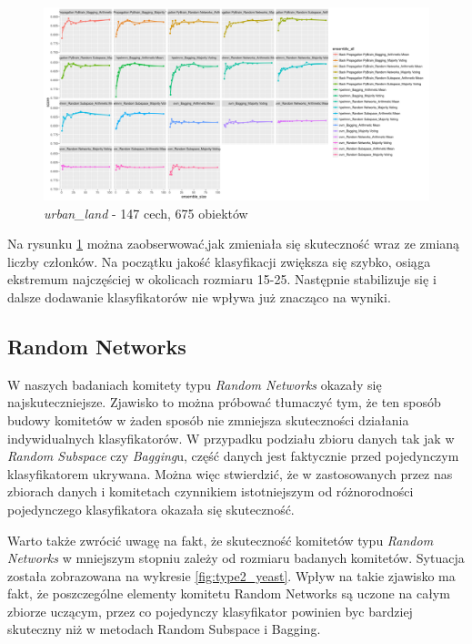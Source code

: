 \documentclass[11pt, a4paper, titlepage]{report}
\begin{document}
\begin{figure}[H]
	\includegraphics[width=1.0\textwidth]{type2_score_size_model_urban_land_cover}
    \centering
    \caption{\textit{urban\_land} - 147 cech, 675 obiektów}
    \label{fig:type2_urban_land_cover}
\end{figure}

Na rysunku \ref{fig:type2_urban_land_cover} można zaobserwować,jak zmieniała się skuteczność wraz ze zmianą liczby członków. Na początku jakość klasyfikacji zwiększa się szybko, osiąga ekstremum najczęściej w okolicach rozmiaru 15-25. Następnie stabilizuje się i dalsze dodawanie klasyfikatorów nie wpływa już znacząco na wyniki.

\subsection{Random Networks}

W naszych badaniach komitety typu \textit{Random Networks} okazały się najskuteczniejsze. Zjawisko to można próbować tłumaczyć tym, że ten sposób budowy komitetów w żaden sposób nie zmniejsza skuteczności działania indywidualnych klasyfikatorów. W przypadku podziału zbioru danych tak jak w \textit{Random Subspace} czy \textit{Bagging}u, część danych jest faktycznie przed pojedynczym klasyfikatorem ukrywana. Można więc stwierdzić, że w zastosowanych przez nas zbiorach danych i komitetach czynnikiem istotniejszym od różnorodności pojedynczego klasyfikatora okazała się skuteczność.

Warto także zwrócić uwagę na fakt, że skuteczność komitetów typu \textit{Random Networks} w mniejszym stopniu zależy od rozmiaru badanych komitetów. Sytuacja została zobrazowana na wykresie \ref{fig:type2_yeast}. Wpływ na takie zjawisko ma fakt, że poszczególne elementy komitetu Random Networks są uczone na całym zbiorze uczącym, przez co pojedynczy klasyfikator powinien byc bardziej skuteczny niż w metodach Random Subspace i Bagging.
\end{document}
